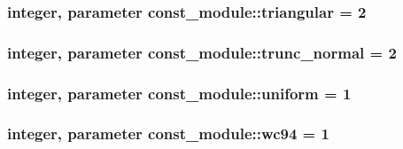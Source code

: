 \subsubsection[{triangular}]{\setlength{\rightskip}{0pt plus 5cm}integer, parameter const\+\_\+module\+::triangular = 2}\label{namespaceconst__module_a7e2946932c4a8471477923bc49aeafe4}
\hypertarget{namespaceconst__module_a3895bfacad51cb8237e9cae087b1663a}{}
\subsubsection[{trunc\+\_\+normal}]{\setlength{\rightskip}{0pt plus 5cm}integer, parameter const\+\_\+module\+::trunc\+\_\+normal = 2}\label{namespaceconst__module_a3895bfacad51cb8237e9cae087b1663a}
\hypertarget{namespaceconst__module_a91a738fc17a72ffc4e34e5141cccc469}{}
\subsubsection[{uniform}]{\setlength{\rightskip}{0pt plus 5cm}integer, parameter const\+\_\+module\+::uniform = 1}\label{namespaceconst__module_a91a738fc17a72ffc4e34e5141cccc469}
\hypertarget{namespaceconst__module_a760935a100ba2e8695aa777f582d5a61}{}
\subsubsection[{wc94}]{\setlength{\rightskip}{0pt plus 5cm}integer, parameter const\+\_\+module\+::wc94 = 1}\label{namespaceconst__module_a760935a100ba2e8695aa777f582d5a61}
